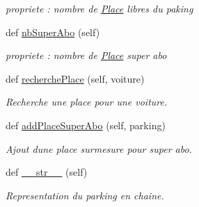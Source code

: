 \begin{DoxyCompactItemize}
\begin{DoxyCompactList}\small\item\em propriete \+: nombre de \hyperlink{classm_1_1_parking_1_1_place}{Place} libres du paking \end{DoxyCompactList}\item 
\hypertarget{classm_1_1_parking_1_1_parking_a70b63236ad1081f33cf7f69e13479f36}{}def \hyperlink{classm_1_1_parking_1_1_parking_a70b63236ad1081f33cf7f69e13479f36}{nb\+Super\+Abo} (self)\label{classm_1_1_parking_1_1_parking_a70b63236ad1081f33cf7f69e13479f36}

\begin{DoxyCompactList}\small\item\em propriete \+: nombre de \hyperlink{classm_1_1_parking_1_1_place}{Place} super abo \end{DoxyCompactList}\item 
def \hyperlink{classm_1_1_parking_1_1_parking_aba1f5bbbeab7bfe7720b6945166888cb}{recherche\+Place} (self, voiture)
\begin{DoxyCompactList}\small\item\em Recherche une place pour une voiture. \end{DoxyCompactList}\item 
def \hyperlink{classm_1_1_parking_1_1_parking_adce5bb85cff9428cfdc94b55fdc513f7}{add\+Place\+Super\+Abo} (self, parking)
\begin{DoxyCompactList}\small\item\em Ajout d\textquotesingle{}une place surmesure pour super abo. \end{DoxyCompactList}\item 
\hypertarget{classm_1_1_parking_1_1_parking_a2a8352c168ec03531e9fb74fc640e5ac}{}def \hyperlink{classm_1_1_parking_1_1_parking_a2a8352c168ec03531e9fb74fc640e5ac}{\+\_\+\+\_\+str\+\_\+\+\_\+} (self)\label{classm_1_1_parking_1_1_parking_a2a8352c168ec03531e9fb74fc640e5ac}

\begin{DoxyCompactList}\small\item\em Representation du parking en chaine. \end{DoxyCompactList}\end{DoxyCompactItemize}
